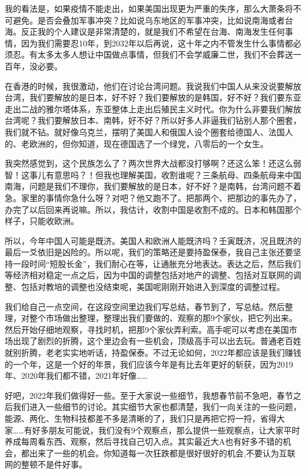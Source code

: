 \documentclass[UTF8, 12pt, a4paper]{ctexrep}
\begin{document}
我的看法是，如果疫情不能走出，如果美国出现更为严重的失序，那么大萧条将不可避免。是否会叠加军事冲突？比如说乌东地区的军事冲突，比如说南海或者台海。反正我的个人建议是非常清楚的，就是我们不希望在台海、南海发生任何事情，因为我们需要忍10年，到2032年以后再说，这十年之内不管发生什么事情都必须忍。有太多太多人想让中国做点事情，但我们不会学威廉二世，我们不会葬送一百年，没必要。

在香港的时候，我很激动，他们在讨论台湾问题。我说我们中国人从来没说要解放台湾，我们要解放的是日本，好不好？我们要解放的是韩国，好不好？我们要东亚走出二战的雅尔塔体系，东亚整体上走出后殖民主义时代。你为什么非要我们解放台湾呢？我们要解放日本、南韩，好不好？所以好多人非逼我们钻别人那个圈套，我们就不钻。就好像乌克兰，摆明了美国人和俄国人设个圈套给德国人、法国人的、老欧洲的，但你知道，现在德国选了一个绿党，八零后的一个女生。

我突然感觉到，这个民族怎么了？两次世界大战都没打够啊？还这么笨！还这么弱智！这事儿有意思吗？！但我也理解美国，收割谁呢？三条航母、四条航母来中国南海，问题是我们不理你，我们要解放的是日本，好不好？是南韩，台湾问题不着急。家里的事情你急什么呀？对吧？他又跑不了。把那两个、把那边的事先办了，办完了以后回来再说嘛。所以，我估计，收割中国是收割不成的。日本和韩国那个样子，只能收欧洲。

所以，今年中国人可能是既济。美国人和欧洲人能既济吗？壬寅既济，况且既济的最后一爻依旧是凶险的。所以呢，我们的策略还是要持盈保泰，我自己主张还要坚持一段时间“短股长金”，我们耐心在等，让通胀充分地表达。表达之后，然后我们等经济相对稳定一点之后，因为中国的调整包括对地产的调整、包括对互联网的调整、包括对教培的调整也没结束呢，美国呢刚刚开始进入到深度的调整过程。

我们给自己一点空间，在这段空间里边我们写总结，春节到了，写总结。然后整理，对整个市场做出整理，整理出我们要做的、观察的那9个家伙，把它列出来。然后开始仔细地观察，寻找时机，把那9个家伙弄利索。高手呢可以考虑在美国市场出现了剧烈的折腾，这个里边会有一些机会，顶级高手可以出去玩。普通老百姓就别折腾，老老实实地听话，持盈保泰。不过无论如何，2022年都应该是我们赚钱的一个年，这是一个好的年景，我们应该今年是有比去年更好的斩获，因为2019年、2020年我们都不错，2021年好像……

好吧，2022年我们做得好一些。至于大家说一些细节，我想春节前不急吧，春节之后我们进入一些细节的讨论。其实细节大家也都清楚，我们一向关注的一些问题，能源、两化、生物科技都差不多是清晰的了，我们只是再把它捋一捋，省得大家……有好多朋友可能说，我们没有9个观察点，那么提供一些观察点，让大家平时养成每周看东西、观察，然后寻找自己切入点。其实最近大A也有好多不错的机会，都出来了一些的机会。你知道每一次狂跌都是很好很好的机会,不要认为互联网的整顿不是件好事。
\end{document}
